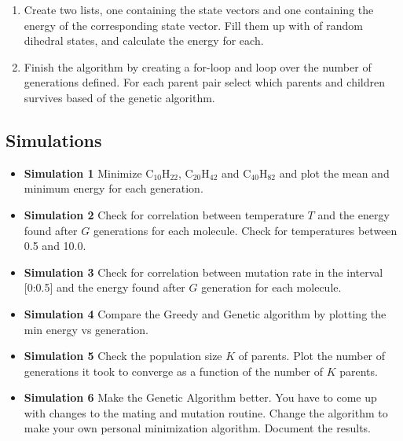 \documentclass{article}
\begin{document}
\begin{enumerate}
    \item Create two lists, one containing the state vectors
    and one containing the energy of the corresponding state vector.
    Fill them up with  of random dihedral states,
    and calculate the energy for each.

    \item Finish the algorithm by creating a for-loop and loop over the number of generations defined. For each parent pair select which parents and children survives based of the genetic algorithm.

\end{enumerate}


\subsection{Simulations}

\begin{itemize}
    \item {\bf Simulation 1}\newline
      Minimize
      C$_{10}$H$_{22}$,
      C$_{20}$H$_{42}$ and
      C$_{40}$H$_{82}$
      and plot the mean and minimum energy for
      each generation.

    \item {\bf Simulation 2}\newline
      Check for correlation between temperature $T$ and the energy found after $G$ generations for each molecule.
      Check for temperatures between 0.5 and 10.0.

    \item {\bf Simulation 3}\newline
      Check for correlation between mutation rate in the interval [0:0.5] and the energy found after $G$ generation for each molecule.

    \item {\bf Simulation 4}\newline
      Compare the Greedy and Genetic algorithm by plotting the min energy vs generation.

    \item {\bf Simulation 5}\newline
      Check the population size $K$ of parents.
      Plot the number of generations it took to converge as a function of the number of $K$ parents.

    \item {\bf Simulation 6}\newline
      Make the Genetic Algorithm better.
      You have to come up with changes to the mating and mutation routine.
      Change the algorithm to make your own personal minimization algorithm.
      Document the results.


\end{itemize}



\end{document}
